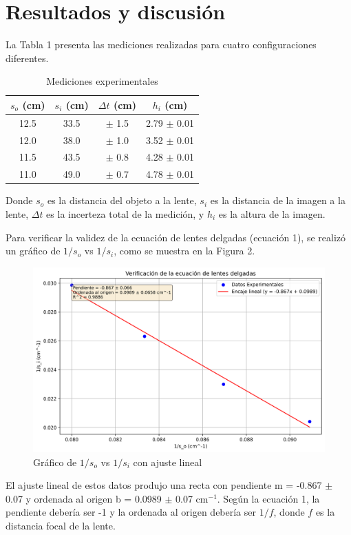 \documentclass[twocolumn,a4paper,11pt]{scrartcl}
\begin{document}
\section{Resultados y discusión}

La Tabla 1 presenta las mediciones realizadas para cuatro configuraciones diferentes.

\begin{table}[h]
\centering
\caption{Mediciones experimentales}
\label{tab:mediciones}
\begin{tabular}{|c|c|c|c|}
\hline
$s_o$ (cm) & $s_i$ (cm) & $\Delta t$ (cm) & $h_i$ (cm) \\
\hline
12.5 & 33.5 & $\pm$ 1.5 & 2.79 $\pm$ 0.01 \\
12.0 & 38.0 & $\pm$ 1.0 & 3.52 $\pm$ 0.01 \\
11.5 & 43.5 & $\pm$ 0.8 & 4.28 $\pm$ 0.01 \\
11.0 & 49.0 & $\pm$ 0.7 & 4.78 $\pm$ 0.01 \\
\hline
\end{tabular}
\end{table}

Donde $s_o$ es la distancia del objeto a la lente, $s_i$ es la distancia de la imagen a la lente, $\Delta t$ es la incerteza total de la medición, y $h_i$ es la altura de la imagen.

Para verificar la validez de la ecuación de lentes delgadas (ecuación 1), se realizó un gráfico de $1/s_o$ vs $1/s_i$, como se muestra en la Figura 2.

\begin{figure}[h]
    \centering
    \includegraphics[width=0.8\linewidth]{lens_equation_verification.png}
    \caption{Gráfico de $1/s_o$ vs $1/s_i$ con ajuste lineal}
    \label{fig:graph}
\end{figure}

El ajuste lineal de estos datos produjo una recta con pendiente m = -0.867 $\pm$ 0.07 y ordenada al origen b = 0.0989 $\pm$ 0.07 cm$^{-1}$. Según la ecuación 1, la pendiente debería ser -1 y la ordenada al origen debería ser $1/f$, donde $f$ es la distancia focal de la lente.
\end{document}
